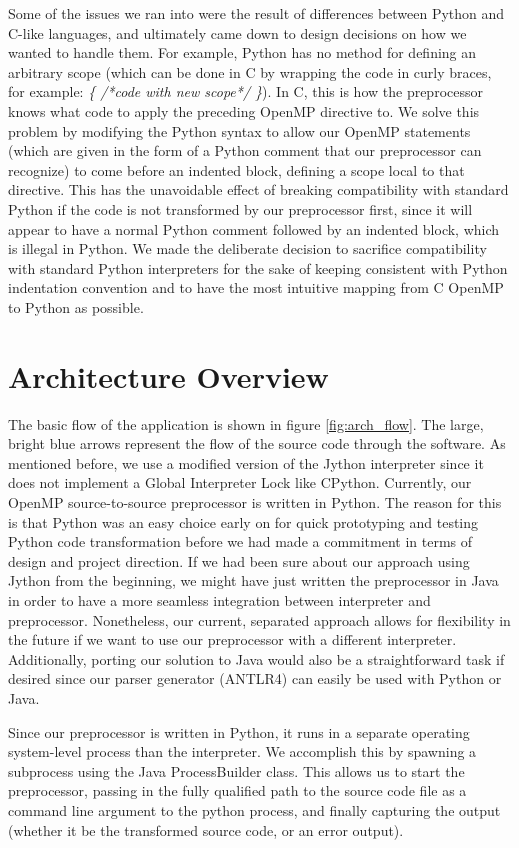 \documentclass[letterpaper,12pt]{article} %
\begin{document}
Some of the issues we ran into were the result of differences between Python and C-like languages, and ultimately came down to design decisions on how we wanted to handle them. For example, Python has no method for defining an arbitrary scope (which can be done in C by wrapping the code in curly braces, for example: \textit{\{ /*code with new scope*/ \}}). In C, this is how the preprocessor knows what code to apply the preceding OpenMP directive to. We solve this problem by modifying the Python syntax to allow our OpenMP statements (which are given in the form of a Python comment that our preprocessor can recognize) to come before an indented block, defining a scope local to that directive. This has the unavoidable effect of breaking compatibility with standard Python if the code is not transformed by our preprocessor first, since it will appear to have a normal Python comment followed by an indented block, which is illegal in Python. We made the deliberate decision to sacrifice compatibility with standard Python interpreters for the sake of keeping consistent with Python indentation convention and to have the most intuitive mapping from C OpenMP to Python as possible. 


\section{Architecture Overview}
The basic flow of the application is shown in figure \ref{fig:arch_flow}. The large, bright blue arrows represent the flow of the source code through the software. As mentioned before, we use a modified version of the Jython interpreter since it does not implement a Global Interpreter Lock like CPython. Currently, our OpenMP source-to-source preprocessor is written in Python. The reason for this is that Python was an easy choice early on for quick prototyping and testing Python code transformation before we had made a commitment in terms of design and project direction. If we had been sure about our approach using Jython from the beginning, we might have just written the preprocessor in Java in order to have a more seamless integration between interpreter and preprocessor.  Nonetheless, our current, separated approach allows for flexibility in the future if we want to use our preprocessor with a different interpreter. Additionally, porting our solution to Java would also be a straightforward task if desired since our parser generator (ANTLR4) can easily be used with Python or Java.

Since our preprocessor is written in Python, it runs in a separate operating system-level process than the interpreter. We accomplish this by spawning a subprocess using the Java ProcessBuilder class. This allows us to start the preprocessor, passing in the fully qualified path to the source code file as a command line argument to the python process, and finally capturing the output (whether it be the transformed source code, or an error output). 
\end{document}
